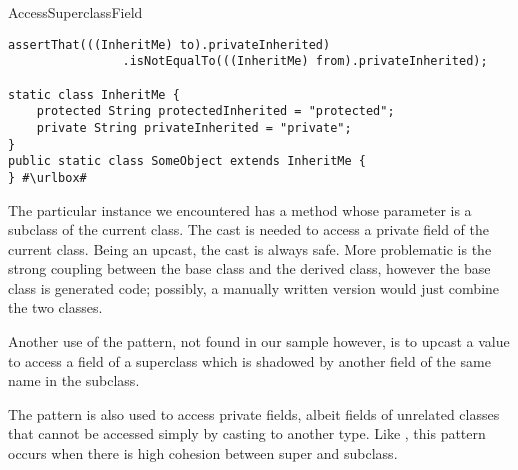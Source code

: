 \begin{pattern}{AccessSuperclassField}
\begin{listing}
\begin{verbatim}
assertThat(((InheritMe) to).privateInherited)
				.isNotEqualTo(((InheritMe) from).privateInherited);

static class InheritMe {
	protected String protectedInherited = "protected";
	private String privateInherited = "private";
}
public static class SomeObject extends InheritMe {
} #\urlbox#
\end{verbatim}
\end{listing}


\issues{}
The particular instance we encountered has a method whose parameter is a subclass of the current class.
The cast is needed to access a private field of the current class.
Being an upcast, the cast is always safe.
More problematic is the strong coupling between the base class and the derived class,
however the base class is generated code;
possibly, a manually written version would just combine the two classes.

Another use of the pattern, not found in our sample however,
is to upcast a value to access a field of a superclass which is shadowed by another field of the same name in the subclass.

The  pattern is also used to access private fields,
albeit fields of unrelated classes that cannot be accessed simply by casting to another type.
Like ,
this pattern occurs when there is high cohesion between super and subclass.

\end{pattern}
